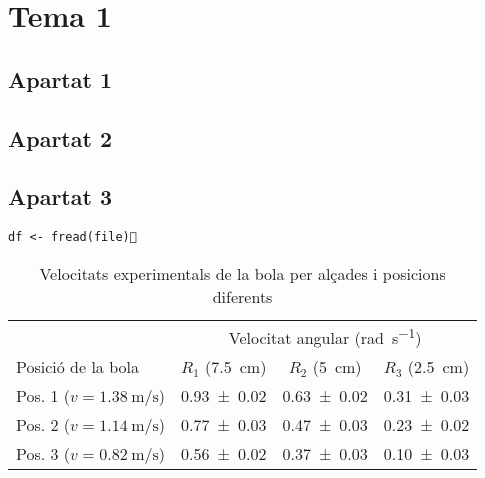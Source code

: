 \section{Tema 1}
\subsection{Apartat 1}

\subsection{Apartat 2}

\subsection{Apartat 3}

\begin{lstlisting}[label=sn:clean-raw, caption=Cleaning raw data]
df <- fread(file)
\end{lstlisting}

\begin{table}[H]
	\centering
	\begin{tabular}{l c c c}
		\toprule
		\toprule
		& \multicolumn{3}{c}{Velocitat angular (\si{\radian\per\s})} \\
		\cmidrule(l){2-4}
		Posició de la bola & $R_{1}$ (\SI{7.5}{\cm}) & $R_{2}$ (\SI{5}{\cm}) & $R_{3}$ (\SI{2.5}{\cm}) \\
		\midrule
		Pos. 1 ($v = \SI{1.38}{\m\per\s}$) & \num{0.93 \pm 0.02} & \num{0.63 \pm 0.02} & \num{0.31 \pm 0.03} \\
		Pos. 2 ($v = \SI{1.14}{\m\per\s}$) & \num{0.77 \pm 0.03} & \num{0.47 \pm 0.03} & \num{0.23 \pm 0.02} \\
		Pos. 3 ($v = \SI{0.82}{\m\per\s}$) & \num{0.56 \pm 0.02} & \num{0.37 \pm 0.03} & \num{0.10 \pm 0.03} \\
		\bottomrule
	\end{tabular}
	\caption{Velocitats experimentals de la bola per alçades i posicions diferents}
	\label{tab:vel-bola-exp}
\end{table}

